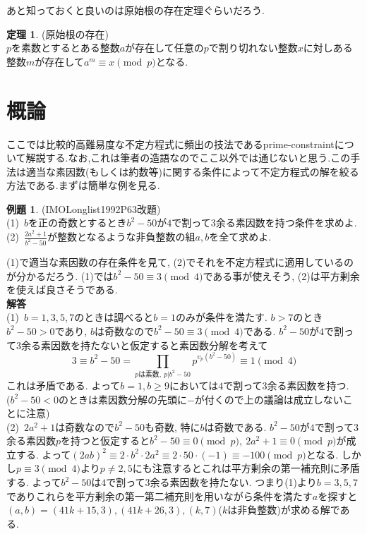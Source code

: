 \documentclass{ltjsarticle}
\theoremstyle{definition}
\newtheorem{thm}{定理}
\newtheorem{expr}{例題}
\begin{document}
あと知っておくと良いのは原始根の存在定理ぐらいだろう.

\begin{thm}(原始根の存在)\\
$p$を素数とするとある整数$a$が存在して任意の$p$で割り切れない整数$x$に対しある整数$m$が存在して$a^m\equiv x\pmod p$となる.
\end{thm}

\section{概論}
ここでは比較的高難易度な不定方程式に頻出の技法であるprime-constraintについて解説する.なお,これは筆者の造語なのでここ以外では通じないと思う.この手法は適当な素因数(もしくは約数等)に関する条件によって不定方程式の解を絞る方法である.まずは簡単な例を見る.

\begin{expr}(IMOLonglist1992P63改題)\\
(1)\ $b$を正の奇数とするとき$b^2-50$が$4$で割って$3$余る素因数を持つ条件を求めよ.\\
(2)\ $\displaystyle\frac{2a^2+1}{b^2-50}$が整数となるような非負整数の組$a,b$を全て求めよ.
\end{expr}

(1)で適当な素因数の存在条件を見て, (2)でそれを不定方程式に適用しているのが分かるだろう. (1)では$b^2-50\equiv3\pmod4$である事が使えそう, (2)は平方剰余を使えば良さそうである.\\
\textbf{解答}\\
(1)\ $b=1,3,5,7$のときは調べると$b=1$のみが条件を満たす. $b>7$のとき$b^2-50>0$であり, $b$は奇数なので$b^2-50\equiv3\pmod4$である. $b^2-50$が$4$で割って$3$余る素因数を持たないと仮定すると素因数分解を考えて$$3\equiv b^2-50=\prod_{pは素数,\ p|b^2-50}p^{v_p(b^2-50)}\equiv1\pmod4$$これは矛盾である. よって$b=1,b\geq9$においては$4$で割って$3$余る素因数を持つ.\\
($b^2-50<0$のときは素因数分解の先頭に$-$が付くので上の議論は成立しないことに注意)\\
(2)\ $2a^2+1$は奇数なので$b^2-50$も奇数, 特に$b$は奇数である. $b^2-50$が$4$で割って$3$余る素因数$p$を持つと仮定すると$b^2-50\equiv0\pmod p,\ 2a^2+1\equiv0\pmod p$が成立する. よって$(2ab)^2\equiv 2\cdot b^2\cdot 2a^2\equiv 2\cdot 50\cdot (-1)\equiv-100\pmod p$となる. しかし$p\equiv3\pmod4$より$p\neq2,5$にも注意するとこれは平方剰余の第一補充則に矛盾する. よって$b^2-50$は$4$で割って$3$余る素因数を持たない. つまり(1)より$b=3,5,7$でありこれらを平方剰余の第一第二補充則を用いながら条件を満たす$a$を探すと$(a,b)=(41k+15,3),(41k+26,3),(k,7)$($k$は非負整数)が求める解である.\\
\end{document}
